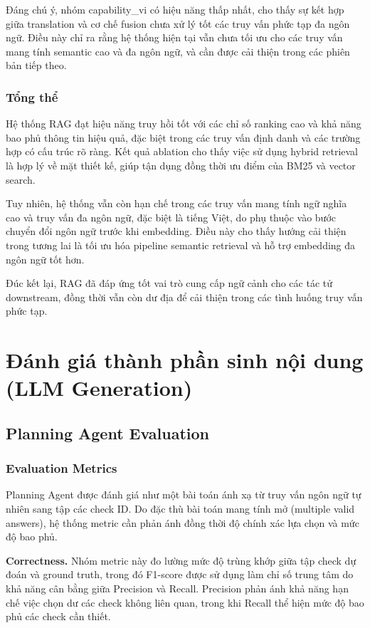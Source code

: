 Đáng chú ý, nhóm capability\_vi có hiệu năng thấp nhất, cho thấy sự kết hợp giữa translation và cơ chế fusion chưa xử lý tốt các truy vấn phức tạp đa ngôn ngữ. Điều này chỉ ra rằng hệ thống hiện tại vẫn chưa tối ưu cho các truy vấn mang tính semantic cao và đa ngôn ngữ, và cần được cải thiện trong các phiên bản tiếp theo.


\subsubsection*{Tổng thể}

Hệ thống RAG đạt hiệu năng truy hồi tốt với các chỉ số ranking cao và khả năng bao phủ thông tin hiệu quả, đặc biệt trong các truy vấn định danh và các trường hợp có cấu trúc rõ ràng. Kết quả ablation cho thấy việc sử dụng hybrid retrieval là hợp lý về mặt thiết kế, giúp tận dụng đồng thời ưu điểm của BM25 và vector search.

Tuy nhiên, hệ thống vẫn còn hạn chế trong các truy vấn mang tính ngữ nghĩa cao và truy vấn đa ngôn ngữ, đặc biệt là tiếng Việt, do phụ thuộc vào bước chuyển đổi ngôn ngữ trước khi embedding. Điều này cho thấy hướng cải thiện trong tương lai là tối ưu hóa pipeline semantic retrieval và hỗ trợ embedding đa ngôn ngữ tốt hơn.

Đúc kết lại, RAG đã đáp ứng tốt vai trò cung cấp ngữ cảnh cho các tác tử downstream, đồng thời vẫn còn dư địa để cải thiện trong các tình huống truy vấn phức tạp.


\section{Đánh giá thành phần sinh nội dung (LLM Generation)}
\label{sec:llm_generation_eval}

\subsection{Planning Agent Evaluation}

\subsubsection*{Evaluation Metrics}

Planning Agent được đánh giá như một bài toán ánh xạ từ truy vấn ngôn ngữ tự nhiên sang tập các check ID. Do đặc thù bài toán mang tính mở (multiple valid answers), hệ thống metric cần phản ánh đồng thời độ chính xác lựa chọn và mức độ bao phủ.

\textbf{Correctness.}
Nhóm metric này đo lường mức độ trùng khớp giữa tập check dự đoán và ground truth, trong đó F1-score được sử dụng làm chỉ số trung tâm do khả năng cân bằng giữa Precision và Recall. Precision phản ánh khả năng hạn chế việc chọn dư các check không liên quan, trong khi Recall thể hiện mức độ bao phủ các check cần thiết.

